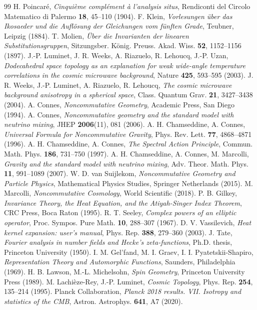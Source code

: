 \documentclass[11pt,a4paper]{article}
\theoremstyle{definition}
\begin{document}
\begin{thebibliography}{99}
 H. Poincar\'e, \emph{Cinqui\`eme compl\'ement \`a l'analysis situs}, Rendiconti del Circolo Matematico di Palermo \textbf{18}, 45--110 (1904).
 F. Klein, \emph{Vorlesungen \"uber das Ikosaeder und die Aufl\"osung der Gleichungen vom f\"unften Grade}, Teubner, Leipzig (1884).
 T. Molien, \emph{\"Uber die Invarianten der linearen Substitutionsgruppen}, Sitzungsber. K\"onig. Preuss. Akad. Wiss. \textbf{52}, 1152--1156 (1897).
 J.-P. Luminet, J. R. Weeks, A. Riazuelo, R. Lehoucq, J.-P. Uzan, \emph{Dodecahedral space topology as an explanation for weak wide-angle temperature correlations in the cosmic microwave background}, Nature \textbf{425}, 593--595 (2003).
 J. R. Weeks, J.-P. Luminet, A. Riazuelo, R. Lehoucq, \emph{The cosmic microwave background anisotropy in a spherical space}, Class. Quantum Grav. \textbf{21}, 3427--3438 (2004).
 A. Connes, \emph{Noncommutative Geometry}, Academic Press, San Diego (1994).
 A. Connes, \emph{Noncommutative geometry and the standard model with neutrino mixing}, JHEP \textbf{2006}(11), 081 (2006).
 A. H. Chamseddine, A. Connes, \emph{Universal Formula for Noncommutative Gravity}, Phys. Rev. Lett. \textbf{77}, 4868--4871 (1996).
 A. H. Chamseddine, A. Connes, \emph{The Spectral Action Principle}, Commun. Math. Phys. \textbf{186}, 731--750 (1997).
 A. H. Chamseddine, A. Connes, M. Marcolli, \emph{Gravity and the standard model with neutrino mixing}, Adv. Theor. Math. Phys. \textbf{11}, 991--1089 (2007).
 W. D. van Suijlekom, \emph{Noncommutative Geometry and Particle Physics}, Mathematical Physics Studies, Springer Netherlands (2015).
 M. Marcolli, \emph{Noncommutative Cosmology}, World Scientific (2018).
 P. B. Gilkey, \emph{Invariance Theory, the Heat Equation, and the Atiyah-Singer Index Theorem}, CRC Press, Boca Raton (1995).
 R. T. Seeley, \emph{Complex powers of an elliptic operator}, Proc. Sympos. Pure Math. \textbf{10}, 288--307 (1967).
 D. V. Vassilevich, \emph{Heat kernel expansion: user's manual}, Phys. Rep. \textbf{388}, 279--360 (2003).
 J. Tate, \emph{Fourier analysis in number fields and Hecke's zeta-functions}, Ph.D. thesis, Princeton University (1950).
 I. M. Gel'fand, M. I. Graev, I. I. Pyatetskii-Shapiro, \emph{Representation Theory and Automorphic Functions}, Saunders, Philadelphia (1969).
 H. B. Lawson, M.-L. Michelsohn, \emph{Spin Geometry}, Princeton University Press (1989).
 M. Lachi\`eze-Rey, J.-P. Luminet, \emph{Cosmic Topology}, Phys. Rep. \textbf{254}, 135--214 (1995).
 Planck Collaboration, \emph{Planck 2018 results. VII. Isotropy and statistics of the CMB}, Astron. Astrophys. \textbf{641}, A7 (2020).
\end{thebibliography}
\end{document}
